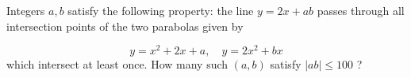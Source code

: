 Integers $a, b$ satisfy the following property: the line $y=2 x+a b$ passes through all intersection points of the two parabolas given by

$$
y=x^{2}+2 x+a, \quad y=2 x^{2}+b x
$$
which intersect at least once. How many such $(a, b)$ satisfy $|a b| \leq 100$ ?